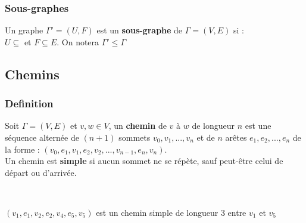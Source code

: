 \documentclass[11pt]{article}
\begin{document}
		\subsubsection{Sous-graphes}
			Un graphe $\Gamma ' = (U,F)$ est un \textbf{sous-graphe} de $\Gamma = (V,E)$ si : \\
			$U\subseteq$ et $F \subseteq E$. On notera $\Gamma ' \leq \Gamma$
	
	\subsection{Chemins}
		\subsubsection{Definition}
			Soit $\Gamma=(V,E)$ et $v,w \in V$, un \textbf{chemin} de $v$ à $w$ de longueur $n$ est une séquence alternée de $(n+1)$ sommets $v_0,v_1,...,v_n$ et de $n$ arêtes $e_1,e_2,...,e_n$ de la forme : $(v_0,e_1,v_1,e_2,v_2,...,v_{n-1},e_n,v_n)$.\\
			
			Un chemin est \textbf{simple} si aucun sommet ne se répète, sauf peut-être celui de départ ou d'arrivée.\\
			
			\begin{minipage}{0.5\textwidth}
			\centering
			 \\
			\end{minipage}\hfill
			\begin{minipage}{0.5\textwidth}
			\center
			$(v_1,e_1,v_2,e_2,v_4,e_5,v_5)$ est un chemin simple de longueur 3 entre $v_1$ et $v_5$
			\end{minipage}\\
			
\end{document}
